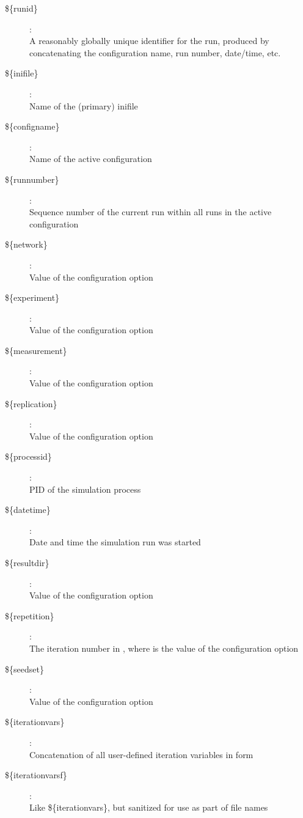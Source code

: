 \begin{description}
\item[\$\{runid\}] : \\
    A reasonably globally unique identifier for the run, produced by
    concatenating the configuration name, run number, date/time, etc.
\item[\$\{inifile\}] : \\
    Name of the (primary) inifile
\item[\$\{configname\}] : \\
    Name of the active configuration
\item[\$\{runnumber\}] : \\
    Sequence number of the current run within all runs in the active
    configuration
\item[\$\{network\}] : \\
    Value of the  configuration option
\item[\$\{experiment\}] : \\
    Value of the  configuration option
\item[\$\{measurement\}] : \\
    Value of the  configuration option
\item[\$\{replication\}] : \\
    Value of the  configuration option
\item[\$\{processid\}] : \\
    PID of the simulation process
\item[\$\{datetime\}] : \\
    Date and time the simulation run was started
\item[\$\{resultdir\}] : \\
    Value of the  configuration option
\item[\$\{repetition\}] : \\
    The iteration number in , where
     is the value of the  configuration option
\item[\$\{seedset\}] : \\
    Value of the  configuration option
\item[\$\{iterationvars\}] : \\
    Concatenation of all user-defined iteration variables in
     form
\item[\$\{iterationvarsf\}] : \\
    Like \$\{iterationvars\}, but sanitized for use as part of file names
\end{description}

